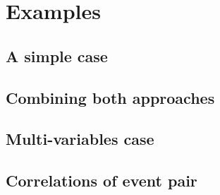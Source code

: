 \section{Examples}
\subsection{A simple case}

\subsection{Combining both approaches}

\subsection{Multi-variables case}

\subsection{Correlations of event pair}


